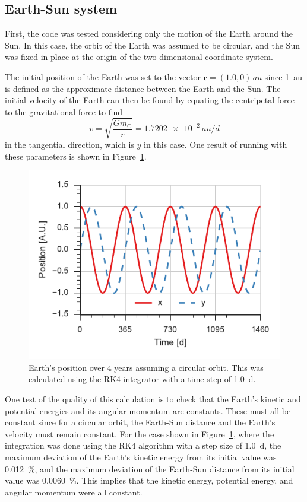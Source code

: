 \documentclass[aps,prc,reprint]{revtex4-1}
\newcommand{\sun}[0]{\ensuremath{\odot}}
\begin{document}
    \subsection{Earth-Sun system}
    \label{sub:earthsun}

        First, the code was tested considering only the motion of the Earth around the Sun. In this case, the orbit of the Earth was assumed to be circular, and the Sun was fixed in place at the origin of the two-dimensional coordinate system.

        The initial position of the Earth was set to the vector $\mathbf{r} = (1.0, 0)\,\si{au}$ since \SI{1}{au} is defined as the approximate distance between the Earth and the Sun. The initial velocity of the Earth can then be found by equating the centripetal force to the gravitational force to find
        \begin{equation*}
            v = \sqrt{\frac{G m_\sun}{r}} = \SI{1.7202e-2}{au/d}
        \end{equation*}
        in the tangential direction, which is $y$ in this case. \cite{Goldstein2002} One result of running with these parameters is shown in Figure~\ref{fig:earthrk4}.

        \begin{figure}
            \includegraphics{earthpos_rk4.pdf}
            \caption{Earth's position over 4 years assuming a circular orbit. This was calculated using the RK4 integrator with a time step of \SI{1.0}{d}.}
            \label{fig:earthrk4}
        \end{figure}

        One test of the quality of this calculation is to check that the Earth's kinetic and potential energies and its angular momentum are constants. These must all be constant since for a circular orbit, the Earth-Sun distance and the Earth's velocity must remain constant. For the case shown in Figure~\ref{fig:earthrk4}, where the integration was done using the RK4 algorithm with a step size of \SI{1.0}{d}, the maximum deviation of the Earth's kinetic energy from its initial value was \SI{0.012}{\percent}, and the maximum deviation of the Earth-Sun distance from its initial value was \SI{0.0060}{\percent}. This implies that the kinetic energy, potential energy, and angular momentum were all constant.
\end{document}
